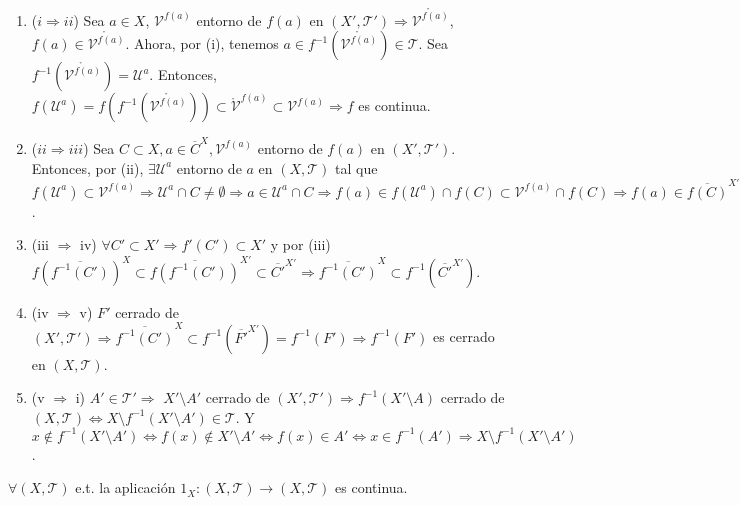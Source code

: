 \begin{dem}
  \begin{enumerate}[label=(\roman*)]
    \item [] ($i \Rightarrow ii$) Sea $a \in X$, $\mathcal{V}^{f(a)}$ entorno de $f(a)$ en $( X', \mathcal{T}' ) \Rightarrow \mathring{\mathcal{V}^{f(a)}}$, $ f(a) \in \mathring{\mathcal{V}^{f(a)}}$. Ahora, por (i), tenemos $a \in f^{-1}(\mathring{\mathcal{V}^{f(a)}}) \in \mathcal{T}$. Sea $f^{-1}(\mathring{\mathcal{V}^{f(a)}}) = \mathcal{U}^{a}$. Entonces, $f(\mathcal{U}^{a}) = f(f^{-1}(\mathring{\mathcal{V}^{f(a)}})) \subset \mathcal{\mathring{V}}^{f(a)} \subset \mathcal{V}^{f(a)} \Rightarrow f$ es continua.
    \item [] ($ii \Rightarrow iii$) Sea $C \subset X, a \in \overline{C}^{X}, \mathcal{V}^{f(a)}$ entorno de $f(a)$ en $( X', \mathcal{T}' )$. Entonces, por (ii), $\exists \mathcal{U}^{a}$ entorno de $a$ en $( X, \mathcal{T} )$ tal que $f(\mathcal{U}^{a}) \subset \mathcal{V}^{f(a)} \Rightarrow \mathcal{U}^{a} \cap C \neq \emptyset \Rightarrow a \in \mathcal{U}^{a} \cap C \Rightarrow f(a) \in f(\mathcal{U}^{a}) \cap f(C) \subset \mathcal{V}^{f(a)} \cap f(C) \Rightarrow f(a) \in \overline{f(C)}^{X'}$.
    \item [](iii $\Rightarrow$ iv) $\forall C' \subset X' \Rightarrow f'(C') \subset X'$ y por (iii) $f(\overline{f^{-1}(C')})^{X} \subset \overline{f(f^{-1}(C'))}^{X'} \subset \overline{C'}^{X'} \Rightarrow \overline{f^{-1}(C')}^{X} \subset f^{-1}(\overline{C'}^{X'})$.
    \item [](iv $\Rightarrow$ v) $F'$ cerrado de $( X', \mathcal{T}' ) \Rightarrow \overline{f^{-1}(C')}^{X} \subset f^{-1}(\overline{F'}^{X'}) = f^{-1}(F') \Rightarrow f^{-1}(F')$ es cerrado en $( X, \mathcal{T} )$.
    \item [] (v $\Rightarrow$ i) $A' \in \mathcal{T}' \Rightarrow $ $X' \setminus A'$ cerrado de $ ( X', \mathcal{T}' ) \Rightarrow f^{-1}(X' \setminus A)$ cerrado de $( X, \mathcal{T} ) \Leftrightarrow X \setminus f^{-1}(X' \setminus A') \in \mathcal{T}$. Y $x \not \in f^{-1}(X' \setminus A') \Leftrightarrow f(x) \not \in X' \setminus A' \Leftrightarrow f(x) \in A' \Leftrightarrow x \in f^{-1}(A') \Rightarrow X \setminus f^{-1}(X' \setminus A')$.
  \end{enumerate}
\end{dem}

\begin{obs}
  $\forall ( X, \mathcal{T} )$ e.t. la aplicación $1_{X}: ( X, \mathcal{T} ) \to ( X, \mathcal{T} )$ es continua.
\end{obs}


